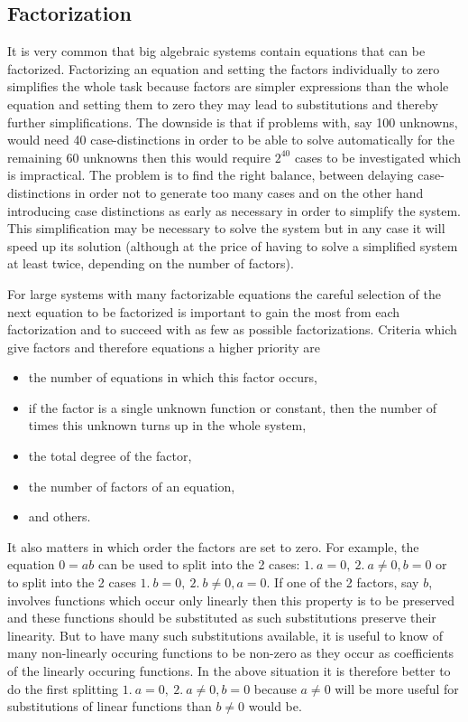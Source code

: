 \documentclass[12pt]{article}
\begin{document}
\subsection{Factorization}
    It is very common that big algebraic systems contain equations that
    can be factorized. Factorizing an equation and setting the factors
    individually to zero simplifies the whole task because factors are
    simpler expressions than the whole equation and setting them to zero
    they may lead to substitutions and thereby further simplifications. The
    downside is that if problems with, say 100 unknowns, would need 40
    case-distinctions in order to be able to solve automatically for the
    remaining 60 unknowns then this would require $2^{40}$ cases to be
    investigated which is impractical. The problem is to find the right
    balance, between delaying case-distinctions in order not to generate
    too many cases and on the other hand introducing case distinctions
    as early as necessary in order to simplify the system. This
    simplification may be necessary to solve the system but in any
    case it will speed up its solution (although at the price of having
    to solve a simplified system at least twice, depending on the number
    of factors).

    For large systems with many factorizable equations the careful
    selection of the next equation to be factorized is important to
    gain the most from each factorization and to succeed with as few
    as possible factorizations.  Criteria which give factors and
    therefore equations a higher priority are
    \begin{itemize}
    \item the number of equations in which this factor occurs,
    \item if the factor is a single unknown function or constant,
      then the number of times this
      unknown turns up in the whole system,
    \item the total degree of the factor,
    \item the number of factors of an equation,
    \item and others.
    \end{itemize}
    It also matters in which order the factors are set to zero. For
    example, the equation  $0=ab$ can be used to split into the 2
    cases: $1.\ a=0, \ 2.\ a\neq 0, b=0$ or to split into the 2 cases
    $1.\ b=0, \ 2.\ b\neq 0, a=0$. If one of the 2 factors, say $b$, involves
    functions which occur only linearly then this property is to be
    preserved and these functions should be substituted as such
    substitutions preserve their linearity. But to have many such
    substitutions available, it is useful to know of many non-linearly
    occuring functions to be non-zero as they occur as coefficients of
    the linearly occuring functions. In the above situation it is
    therefore better to do the first splitting $1.\ a=0, \ 2.\ a\neq 0, b=0$
    because $a\neq 0$ will be more useful for substitutions of linear
    functions than $b\neq 0$ would be.
\end{document}
